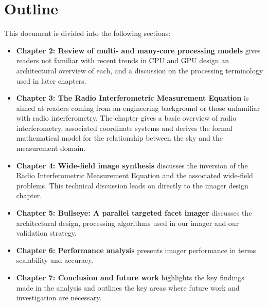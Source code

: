 \section{Outline}
This document is divided into the following sections:
\begin{itemize}
 \item \textbf{Chapter 2: Review of multi- and many-core processing models} gives readers not familiar with recent trends in CPU and GPU design an architectural overview of each, and a discussion
 on the processing terminology used in later chapters. 
 \item \textbf{Chapter 3: The Radio Interferometric Measurement Equation} is aimed at readers coming from an engineering background or those unfamiliar with radio interferometry. The chapter 
 gives a basic overview of radio interferometry, associated coordinate systems and derives the formal mathematical model for the relationship between the sky and the measurement domain.
 \item \textbf{Chapter 4: Wide-field image synthesis} discusses the inversion of the Radio Interferometric Measurement Equation and the associated wide-field problems. This technical 
 discussion leads on directly to the imager design chapter.
 \item \textbf{Chapter 5: Bullseye: A parallel targeted facet imager} discusses the architectural design, processing algorithms used in our imager and our validation strategy.
 \item \textbf{Chapter 6: Performance analysis} presents imager performance in terms scalability and accuracy.
 \item \textbf{Chapter 7: Conclusion and future work} highlights the key findings made in the analysis and outlines the key areas where future work and investigation are necessary.
\end{itemize}
